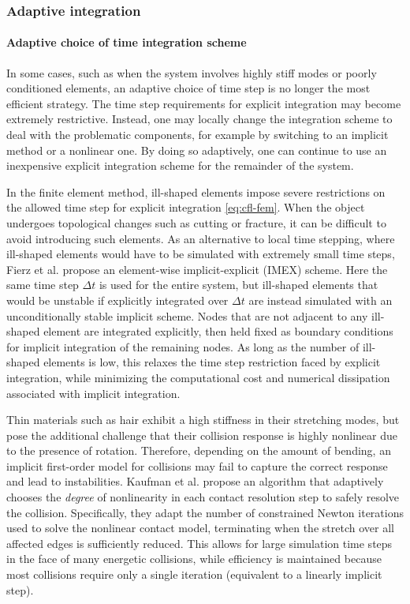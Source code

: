 \subsubsection{Adaptive integration}
\label{sec:adaptive-integration}

\paragraph*{Adaptive choice of time integration scheme}
In some cases, such as when the system involves highly stiff modes or poorly conditioned elements, an adaptive choice of time step is no longer the most efficient strategy.
The time step requirements for explicit integration may become extremely restrictive.
Instead, one may locally change the integration scheme to deal with the problematic components, for example by switching to an implicit method or a nonlinear one.
By doing so adaptively, one can continue to use an inexpensive explicit integration scheme for the remainder of the system.

In the finite element method, ill-shaped elements impose severe restrictions on the allowed time step for explicit integration \eqref{eq:cfl-fem}.
When the object undergoes topological changes such as cutting or fracture, it can be difficult to avoid introducing such elements.
As an alternative to local time stepping, where ill-shaped elements would have to be simulated with extremely small time steps, Fierz et al. \cite{Fierz2011} propose an element-wise implicit-explicit (IMEX) scheme.
Here the same time step $\Delta t$ is used for the entire system, but ill-shaped elements that would be unstable if explicitly integrated over $\Delta t$ are instead simulated with an unconditionally stable implicit scheme.
Nodes that are not adjacent to any ill-shaped element are integrated explicitly, then held fixed as boundary conditions for implicit integration of the remaining nodes.
As long as the number of ill-shaped elements is low, this relaxes the time step restriction faced by explicit integration, while minimizing the computational cost and numerical dissipation associated with implicit integration.

Thin materials such as hair exhibit a high stiffness in their stretching modes, but pose the additional challenge that their collision response is highly nonlinear due to the presence of rotation.
Therefore, depending on the amount of bending, an implicit first-order model for collisions may fail to capture the correct response and lead to instabilities.
Kaufman et al. \cite{Kaufman2014} propose an algorithm that adaptively chooses the \emph{degree} of nonlinearity in each contact resolution step to safely resolve the collision.
Specifically, they adapt the number of constrained Newton iterations used to solve the nonlinear contact model, terminating when the stretch over all affected edges is sufficiently reduced.
This allows for large simulation time steps in the face of many energetic collisions, while efficiency is maintained because most collisions require only a single iteration (equivalent to a linearly implicit step).

